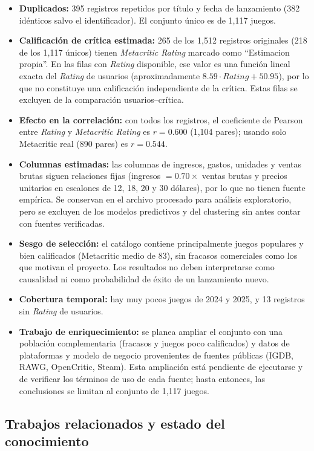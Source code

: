 \documentclass[letterpaper,11pt]{article}
\begin{document}
\begin{itemize}
  \item \textbf{Duplicados:} 395 registros repetidos por título y fecha de lanzamiento (382 idénticos salvo el identificador). El conjunto único es de 1,117 juegos.
  \item \textbf{Calificación de crítica estimada:} 265 de los 1,512 registros originales (218 de los 1,117 únicos) tienen \textit{Metacritic Rating} marcado como ``Estimacion propia''. En las filas con \textit{Rating} disponible, ese valor es una función lineal exacta del \textit{Rating} de usuarios (aproximadamente $8.59\cdot Rating + 50.95$), por lo que no constituye una calificación independiente de la crítica. Estas filas se excluyen de la comparación usuarios--crítica.
  \item \textbf{Efecto en la correlación:} con todos los registros, el coeficiente de Pearson entre \textit{Rating} y \textit{Metacritic Rating} es $r=0.600$ (1,104 pares); usando solo Metacritic real (890 pares) es $r=0.544$.
  \item \textbf{Columnas estimadas:} las columnas de ingresos, gastos, unidades y ventas brutas siguen relaciones fijas (ingresos $=0.70\times$ ventas brutas y precios unitarios en escalones de 12, 18, 20 y 30 dólares), por lo que no tienen fuente empírica. Se conservan en el archivo procesado para análisis exploratorio, pero se excluyen de los modelos predictivos y del clustering sin antes contar con fuentes verificadas.
  \item \textbf{Sesgo de selección:} el catálogo contiene principalmente juegos populares y bien calificados (Metacritic medio de 83), sin fracasos comerciales como los que motivan el proyecto. Los resultados no deben interpretarse como causalidad ni como probabilidad de éxito de un lanzamiento nuevo.
  \item \textbf{Cobertura temporal:} hay muy pocos juegos de 2024 y 2025, y 13 registros sin \textit{Rating} de usuarios.
  \item \textbf{Trabajo de enriquecimiento:} se planea ampliar el conjunto con una población complementaria (fracasos y juegos poco calificados) y datos de plataformas y modelo de negocio provenientes de fuentes públicas (IGDB, RAWG, OpenCritic, Steam). Esta ampliación está pendiente de ejecutarse y de verificar los términos de uso de cada fuente; hasta entonces, las conclusiones se limitan al conjunto de 1,117 juegos.
\end{itemize}

\newpage
\subsection{Trabajos relacionados y estado del conocimiento}
\end{document}
